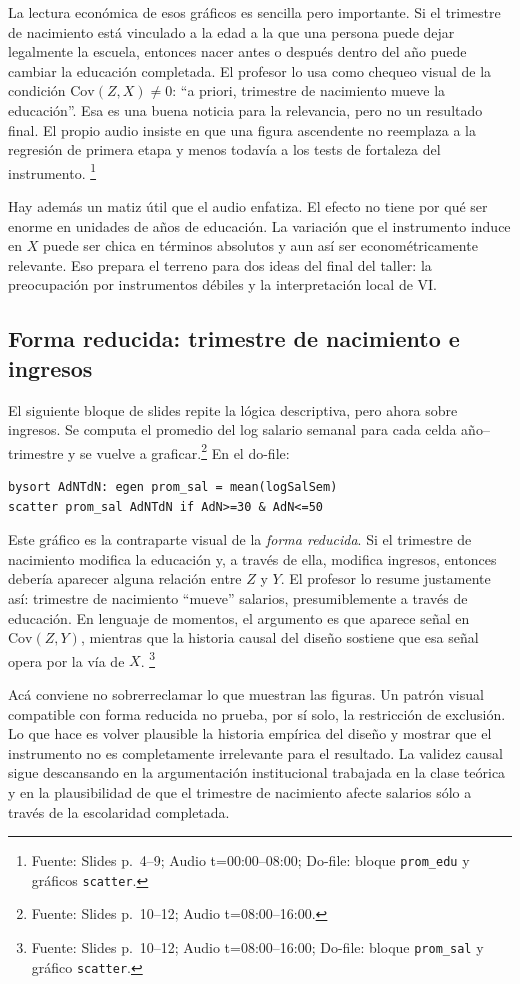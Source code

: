 \documentclass[11pt]{article}
\newcommand{\q}[1]{``#1''}
\newcommand{\Cov}{\mathrm{Cov}}
\newcommand{\source}[2]{\footnote{Fuente: Slides p.~#1; Audio t=#2.}}
\newcommand{\sourced}[3]{\footnote{Fuente: Slides p.~#1; Audio t=#2; Do-file: #3.}}
\begin{document}
La lectura económica de esos gráficos es sencilla pero importante. Si el trimestre de nacimiento está vinculado a la edad a la que una persona puede dejar legalmente la escuela, entonces nacer antes o después dentro del año puede cambiar la educación completada. El profesor lo usa como chequeo visual de la condición \(\Cov(Z,X)\neq 0\): \q{a priori, trimestre de nacimiento mueve la educación}. Esa es una buena noticia para la relevancia, pero no un resultado final. El propio audio insiste en que una figura ascendente no reemplaza a la regresión de primera etapa y menos todavía a los tests de fortaleza del instrumento. \sourced{4--9}{00:00--08:00}{bloque \texttt{prom\_edu} y gráficos \texttt{scatter}}

Hay además un matiz útil que el audio enfatiza. El efecto no tiene por qué ser enorme en unidades de años de educación. La variación que el instrumento induce en \(X\) puede ser chica en términos absolutos y aun así ser econométricamente relevante. Eso prepara el terreno para dos ideas del final del taller: la preocupación por instrumentos débiles y la interpretación local de VI.

\subsection{Forma reducida: trimestre de nacimiento e ingresos}

El siguiente bloque de slides repite la lógica descriptiva, pero ahora sobre ingresos. Se computa el promedio del log salario semanal para cada celda año--trimestre y se vuelve a graficar.\source{10--12}{08:00--16:00} En el do-file:
\begin{lstlisting}
bysort AdNTdN: egen prom_sal = mean(logSalSem)
scatter prom_sal AdNTdN if AdN>=30 & AdN<=50
\end{lstlisting}

Este gráfico es la contraparte visual de la \emph{forma reducida}. Si el trimestre de nacimiento modifica la educación y, a través de ella, modifica ingresos, entonces debería aparecer alguna relación entre \(Z\) y \(Y\). El profesor lo resume justamente así: trimestre de nacimiento \q{mueve} salarios, presumiblemente a través de educación. En lenguaje de momentos, el argumento es que aparece señal en \(\Cov(Z,Y)\), mientras que la historia causal del diseño sostiene que esa señal opera por la vía de \(X\). \sourced{10--12}{08:00--16:00}{bloque \texttt{prom\_sal} y gráfico \texttt{scatter}}

Acá conviene no sobrerreclamar lo que muestran las figuras. Un patrón visual compatible con forma reducida no prueba, por sí solo, la restricción de exclusión. Lo que hace es volver plausible la historia empírica del diseño y mostrar que el instrumento no es completamente irrelevante para el resultado. La validez causal sigue descansando en la argumentación institucional trabajada en la clase teórica y en la plausibilidad de que el trimestre de nacimiento afecte salarios sólo a través de la escolaridad completada.
\end{document}
